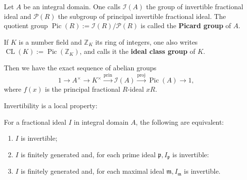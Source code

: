\documentclass[12pt, oneside]{book}
\begin{document}
\begin{definition}
    Let $A$ be an integral domain.
    One calls $\mathcal{I}(A)$ the group of invertible fractional ideal and $\mathcal{P}(R)$ the subgroup of principal invertible fractional ideal.
    The quotient group $\operatorname{Pic}(R):=\mathcal{I}(R) / \mathcal{P}(R)$ is called the \textbf{Picard group} of $A$.

    If $K$ is a number field and $\mathbb{Z}_K$ its ring of
    integers, one also writes $\operatorname{CL}(K):=\operatorname{Pic}\left(\mathbb{Z}_K\right)$, and calls it the \textbf{ideal class group} of $K$.
    \begin{remark}
        Then we have the exact sequence of abelian groups
        \begin{equation*}
            1 \rightarrow A^{\times} \rightarrow K^{\times} \xrightarrow{\mathrm{prin}} \mathcal{I}(A) \xrightarrow{\mathrm{proj}} \operatorname{Pic}(A) \rightarrow 1,
        \end{equation*}
        where $f(x)$ is the principal fractional $R$-ideal $x R$.
    \end{remark}
\end{definition}

Invertibility is a local property:
\begin{proposition}
    For a fractional ideal $I$ in integral domain $A$, the following are equivalent:
    \begin{enumerate}
        \item
              $I$ is invertible;
        \item
              $I$ is finitely generated and, for each prime ideal $\mathfrak{p}, I_{\mathfrak{p}}$ is invertible:
        \item
              $I$ is finitely generated and, for each maximal ideal $\mathfrak{m}, I_{\mathfrak{m}}$ is invertible.
    \end{enumerate}
\end{proposition}
\end{document}
